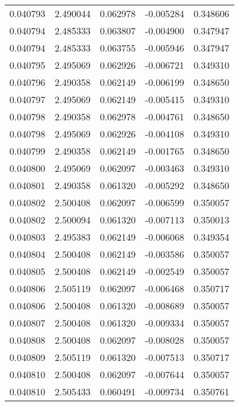 \begin{tabular}{lrrrr}
0.040793    &  2.490044 &  0.062978 & -0.005284 &             0.348606 \\
0.040794    &  2.485333 &  0.063807 & -0.004900 &             0.347947 \\
0.040794    &  2.485333 &  0.063755 & -0.005946 &             0.347947 \\
0.040795    &  2.495069 &  0.062926 & -0.006721 &             0.349310 \\
0.040796    &  2.490358 &  0.062149 & -0.006199 &             0.348650 \\
0.040797    &  2.495069 &  0.062149 & -0.005415 &             0.349310 \\
0.040798    &  2.490358 &  0.062978 & -0.004761 &             0.348650 \\
0.040798    &  2.495069 &  0.062926 & -0.004108 &             0.349310 \\
0.040799    &  2.490358 &  0.062149 & -0.001765 &             0.348650 \\
0.040800    &  2.495069 &  0.062097 & -0.003463 &             0.349310 \\
0.040801    &  2.490358 &  0.061320 & -0.005292 &             0.348650 \\
0.040802    &  2.500408 &  0.062097 & -0.006599 &             0.350057 \\
0.040802    &  2.500094 &  0.061320 & -0.007113 &             0.350013 \\
0.040803    &  2.495383 &  0.062149 & -0.006068 &             0.349354 \\
0.040804    &  2.500408 &  0.062149 & -0.003586 &             0.350057 \\
0.040805    &  2.500408 &  0.062149 & -0.002549 &             0.350057 \\
0.040806    &  2.505119 &  0.062097 & -0.006468 &             0.350717 \\
0.040806    &  2.500408 &  0.061320 & -0.008689 &             0.350057 \\
0.040807    &  2.500408 &  0.061320 & -0.009334 &             0.350057 \\
0.040808    &  2.500408 &  0.062097 & -0.008028 &             0.350057 \\
0.040809    &  2.505119 &  0.061320 & -0.007513 &             0.350717 \\
0.040810    &  2.500408 &  0.062097 & -0.007644 &             0.350057 \\
0.040810    &  2.505433 &  0.060491 & -0.009734 &             0.350761 \\

\end{tabular}
